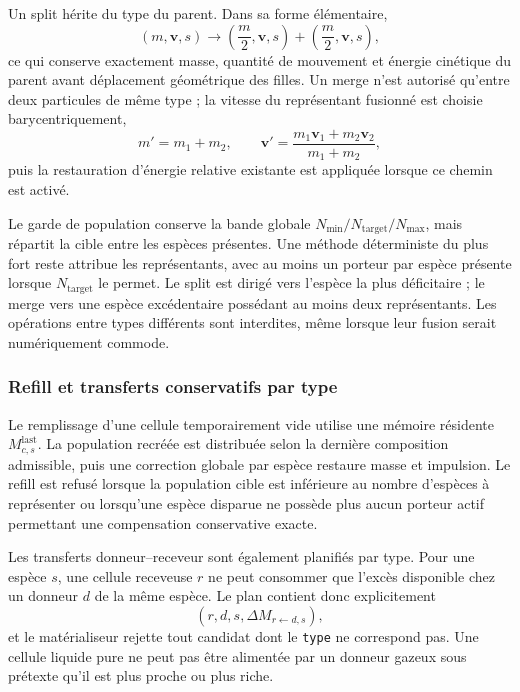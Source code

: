\documentclass[11pt,a4paper]{article}
\begin{document}
Un split hérite du type du parent. Dans sa forme élémentaire,
\begin{equation}
  (m,\bm{v},s)
  \longrightarrow
  \left(\frac{m}{2},\bm{v},s\right)
  +\left(\frac{m}{2},\bm{v},s\right),
\end{equation}
ce qui conserve exactement masse, quantité de mouvement et énergie cinétique du parent avant déplacement géométrique des filles. Un merge n'est autorisé qu'entre deux particules de même type ; la vitesse du représentant fusionné est choisie barycentriquement,
\begin{equation}
  m'=m_1+m_2,
  \qquad
  \bm{v}'=\frac{m_1\bm{v}_1+m_2\bm{v}_2}{m_1+m_2},
\end{equation}
puis la restauration d'énergie relative existante est appliquée lorsque ce chemin est activé.

Le garde de population conserve la bande globale $N_{\min}/N_{\mathrm{target}}/N_{\max}$, mais répartit la cible entre les espèces présentes. Une méthode déterministe du plus fort reste attribue les représentants, avec au moins un porteur par espèce présente lorsque $N_{\mathrm{target}}$ le permet. Le split est dirigé vers l'espèce la plus déficitaire ; le merge vers une espèce excédentaire possédant au moins deux représentants. Les opérations entre types différents sont interdites, même lorsque leur fusion serait numériquement commode.

\subsubsection{Refill et transferts conservatifs par type}

Le remplissage d'une cellule temporairement vide utilise une mémoire résidente $M^{\mathrm{last}}_{c,s}$. La population recréée est distribuée selon la dernière composition admissible, puis une correction globale par espèce restaure masse et impulsion. Le refill est refusé lorsque la population cible est inférieure au nombre d'espèces à représenter ou lorsqu'une espèce disparue ne possède plus aucun porteur actif permettant une compensation conservative exacte.

Les transferts donneur--receveur sont également planifiés par type. Pour une espèce $s$, une cellule receveuse $r$ ne peut consommer que l'excès disponible chez un donneur $d$ de la même espèce. Le plan contient donc explicitement
\begin{equation}
  (r,d,s,\Delta M_{r\leftarrow d,s}),
\end{equation}
et le matérialiseur rejette tout candidat dont le \texttt{type} ne correspond pas. Une cellule liquide pure ne peut pas être alimentée par un donneur gazeux sous prétexte qu'il est plus proche ou plus riche.
\end{document}

